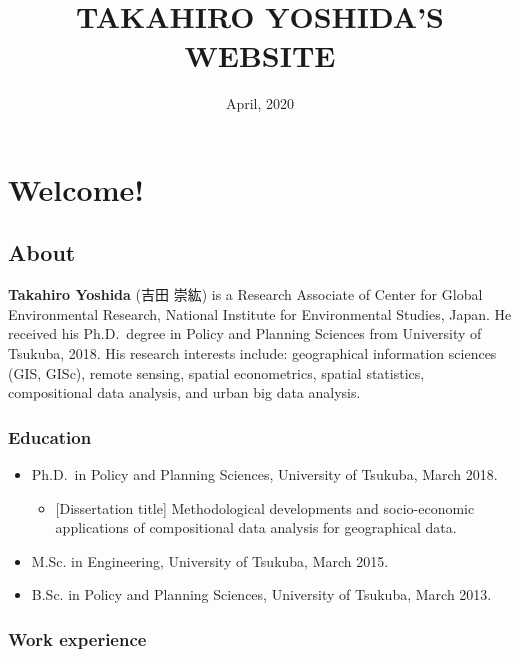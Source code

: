 \documentclass[]{book}
\title{TAKAHIRO YOSHIDA'S WEBSITE}
\author{}
\date{April, 2020}
\providecommand{\tightlist}{%
  \setlength{\itemsep}{0pt}\setlength{\parskip}{0pt}}
\begin{document}
\maketitle

{
\setcounter{tocdepth}{1}
\tableofcontents
}
\hypertarget{welcome}{%
\chapter*{Welcome!}\label{welcome}}

\hypertarget{about}{%
\section*{About}\label{about}}

\textbf{Takahiro Yoshida} (吉田 崇紘) is a Research Associate of Center for Global Environmental Research, National Institute for Environmental Studies, Japan. He received his Ph.D.~degree in Policy and Planning Sciences from University of Tsukuba, 2018. His research interests include: geographical information sciences (GIS, GISc), remote sensing, spatial econometrics, spatial statistics, compositional data analysis, and urban big data analysis.

\hypertarget{education}{%
\subsection*{Education}\label{education}}

\begin{itemize}
\tightlist
\item
  Ph.D.~in Policy and Planning Sciences, University of Tsukuba, March 2018.

  \begin{itemize}
  \tightlist
  \item
    {[}Dissertation title{]} Methodological developments and socio-economic applications of compositional data analysis for geographical data.
  \end{itemize}
\item
  M.Sc. in Engineering, University of Tsukuba, March 2015.
\item
  B.Sc. in Policy and Planning Sciences, University of Tsukuba, March 2013.
\end{itemize}

\hypertarget{work-experience}{%
\subsection*{Work experience}\label{work-experience}}
\end{document}
